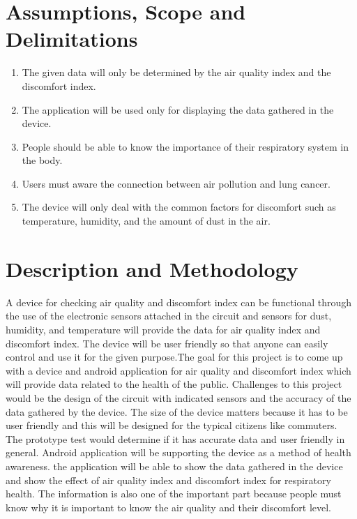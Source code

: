 \section{Assumptions, Scope and Delimitations}

\begin{enumerate}
\item The given data will only be determined by the air quality index and the discomfort index.

\item The application will be used only for displaying the data gathered in the device.

\item People should be able to know the importance of their respiratory system in the body.

\item Users must aware the connection between air pollution and lung cancer.

\item The device will only deal with the common factors for discomfort such as temperature, humidity, and the amount of dust in the air.

\end{enumerate}

\section{Description and Methodology}

A device for checking air quality and discomfort index can be functional through the use of the electronic sensors attached in the circuit and sensors for dust, humidity, and temperature will provide the data for air quality index and discomfort index. The device will be user friendly so that anyone can easily control and use it for the given purpose.The goal for this project is to come up with a device and android application for air quality and discomfort index which will provide data related to the health of the public.  Challenges to this project would be the design of the circuit with indicated sensors and the accuracy of the data gathered by the device. The size of the device matters because it has to be user friendly and this will be designed for the typical citizens like commuters. The prototype test  would determine if it has accurate data and user friendly in general. Android application will be supporting the device as a method of health awareness. the application will be able to show the data gathered in the device and show the effect of air quality index and discomfort index for respiratory health. The information is also one of the important part because people must know why it is important to know the air quality and their discomfort level.



